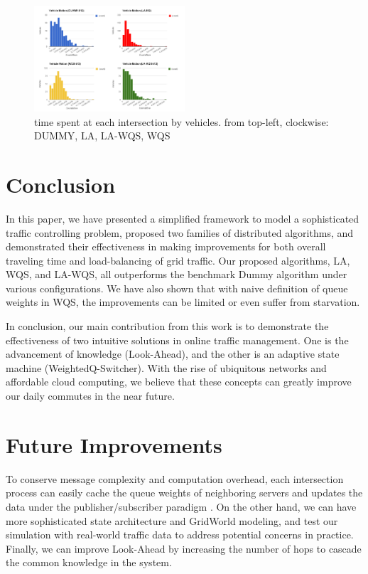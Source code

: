 \documentclass[conference]{IEEEtran}
\begin{document}
\begin{figure}[h]
    \center    
    \includegraphics[width=0.5\textwidth]{images/vehicle_motion.png}
	\caption{time spent at each intersection by vehicles. from top-left, clockwise: DUMMY, LA, LA-WQS, WQS}
	\label{vehicle_motion}
\end{figure}

\section{Conclusion}
In this paper, we have presented a simplified framework to model a sophisticated traffic controlling problem, proposed two families of distributed algorithms, and demonstrated their effectiveness in making improvements for both overall traveling time and load-balancing of grid traffic. Our proposed algorithms, LA, WQS, and LA-WQS, all outperforms the benchmark Dummy algorithm under various configurations. We have also shown that with naive definition of queue weights in WQS, the improvements can be limited or even suffer from starvation. 

In conclusion, our main contribution from this work is to demonstrate the effectiveness of two intuitive solutions in online traffic management. One is the advancement of knowledge (Look-Ahead), and the other is an adaptive state machine (WeightedQ-Switcher). With the rise of ubiquitous networks and affordable cloud computing, we believe that these concepts can greatly improve our daily commutes in the near future.

\section{Future Improvements}

To conserve message complexity and computation overhead, each intersection process can easily cache the queue weights of neighboring servers and updates the data under the publisher/subscriber paradigm \cite{pub sub}. On the other hand, we can have more sophisticated state architecture and GridWorld modeling, and test our simulation with real-world traffic data to address potential concerns in practice. Finally, we can improve Look-Ahead by increasing the number of hops to cascade the common knowledge in the system.
\end{document}

